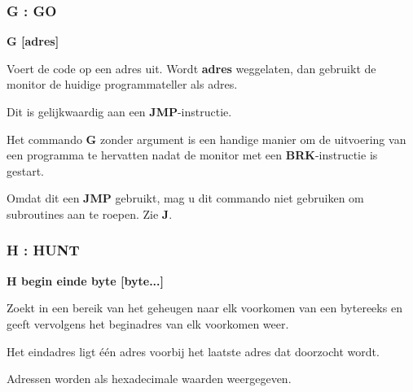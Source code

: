 
\subsubsection{G : GO}
\begin{description}[leftmargin=2cm,style=nextline]
\item [Formaat:] {\bf G [adres]}\item [Gebruik:] Voert de code op een adres uit. Wordt {\bf adres} weggelaten, dan gebruikt de monitor de huidige programmateller als adres.

\item [Opmerkingen:] Dit is gelijkwaardig aan een {\bf JMP}-instructie.

    Het commando {\bf G} zonder argument is een handige manier om de uitvoering van een programma te hervatten nadat de monitor met een {\bf BRK}-instructie is gestart.

    Omdat dit een {\bf JMP} gebruikt, mag u dit commando niet gebruiken om subroutines aan te roepen. Zie {\bf J}.

\end{description}


\subsubsection{H : HUNT}
\begin{description}[leftmargin=2cm,style=nextline]
\item [Formaat:] {\bf H begin einde byte [byte...]}\item [Gebruik:] Zoekt in een bereik van het geheugen naar elk voorkomen van een bytereeks en geeft vervolgens het beginadres van elk voorkomen weer.

\item [Opmerkingen:] Het eindadres ligt één adres voorbij het laatste adres dat doorzocht wordt.

    Adressen worden als hexadecimale waarden weergegeven.

\end{description}


